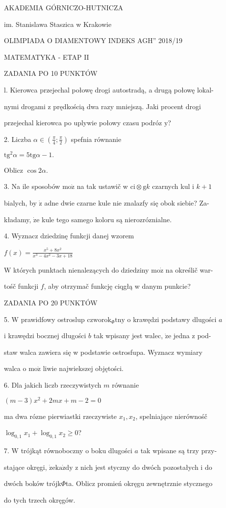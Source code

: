 \documentclass[a4paper,12pt]{article}
\begin{document}
AKADEMIA GÓRNICZO-HUTNICZA

im. Stanislawa Staszica w Krakowie

OLIMPIADA O DIAMENTOWY INDEKS AGH'' 2018/19

MATEMATYKA - ETAP II

ZADANIA PO 10 PUNKTÓW

l. Kierowca przejechal połowę drogi autostradą, a drugą połowę lokal-

nymi drogami z prędkością dwa razy mniejszą. Jaki procent drogi

przejechal kierowca po uplywie połowy czasu podróz $\mathrm{y}$?

2. Liczba $\alpha\in (\displaystyle \frac{\pi}{4};\frac{\pi}{2})$ spefnia równanie

$\mathrm{t}\mathrm{g}^{2}\alpha=5\mathrm{t}\mathrm{g}\alpha-1.$

Oblicz $\cos 2\alpha.$

3. Na ile sposobów $\mathrm{m}\mathrm{o}\dot{\mathrm{z}}$ na tak ustawič w $\mathrm{c}\mathrm{i}\otimes \mathrm{g} k$ czarnych kul i $k+1$

bialych, by $\dot{\mathrm{z}}$ adne dwie czarne kule nie znalazfy się obok siebie? Za-

kładamy, $\dot{\mathrm{z}}\mathrm{e}$ kule tego samego koloru są nierozróznialne.

4. Wyznacz dziedzinę funkcji danej wzorem

$f(x)=\displaystyle \frac{x^{5}+8x^{2}}{x^{3}-4x^{2}-3x+18}$

$\mathrm{W}$ których punktach nienalezących do dziedziny $\mathrm{m}\mathrm{o}\dot{\mathrm{z}}$ na określič war-

tośč funkcji $f$, aby otrzymač funkcję ciqgłą w danym punkcie?

ZADANIA PO 20 PUNKTÓW

5. $\mathrm{W}$ prawidfowy ostroslup $\mathrm{c}\mathrm{z}\mathrm{w}\mathrm{o}\mathrm{r}\mathrm{o}\mathrm{k}_{\Phi}\mathrm{t}\mathrm{n}\mathrm{y}$ o krawędzi podstawy dlugości $a$

i krawędzi bocznej długości $b$ tak wpisany jest walec, $\dot{\mathrm{z}}\mathrm{e}$ jedna z pod-

staw walca zawiera się w podstawie ostrosfupa. Wyznacz wymiary

walca o $\mathrm{m}\mathrm{o}\dot{\mathrm{z}}$ liwie najwiekszej objętości.

6. Dla jakich liczb rzeczywistych $m$ równanie

$(m-3)x^{2}+2mx+m-2=0$

ma dwa rózne pierwiastki rzeczywiste $x_{1}, x_{2}$, spelniające nierównośč

$\log_{0,1}x_{1}+\log_{0,1}x_{2}\geq 0$?

7. $\mathrm{W}$ trójkąt równoboczny o boku dlugości $a$ tak wpisane są trzy przy-

stające okręgi, $\dot{\mathrm{z}}\mathrm{e}\mathrm{k}\mathrm{a}\dot{\mathrm{z}}\mathrm{d}\mathrm{y}$ z nich jest styczny do dwóch pozostałych i do

dwóch boków trójk$\Phi$ta. Oblicz promień okręgu zewnętrznie stycznego

do tych trzech okręgów.
\end{document}
